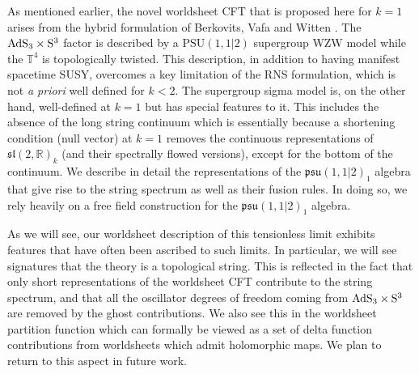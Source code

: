 \documentclass[12pt,a4paper]{article}
\begin{document}
As mentioned earlier, the novel worldsheet CFT that is proposed here for $k=1$ arises from the hybrid formulation of Berkovits, Vafa and Witten \cite{Berkovits:1999im}. 
The ${\rm AdS}_3\times {\rm S}^3$ \linebreak factor is described by a 
$\mathrm{PSU}(1,1|2)$ supergroup WZW model while the  $\mathbb{T}^4$ is topologically twisted.  
This description, in addition to having manifest spacetime SUSY,  overcomes a key limitation of the RNS formulation, which is not {\it a priori} well defined for $k <2$. The supergroup sigma model is, on the other hand, well-defined at $k=1$ but has special features to it. This includes the absence of the long string continuum which is essentially because a shortening condition (null vector) at $k=1$ removes the continuous representations of $\mathfrak{sl}(2,\mathds{R})_k$ (and their spectrally flowed versions), %
except for the bottom of the continuum. We describe in detail the representations of the $\mathfrak{psu}(1,1|2)_1$ algebra that give rise to the string spectrum as well as their fusion rules. In doing so, we rely heavily on a free field construction for the  $\mathfrak{psu}(1,1|2)_1$ algebra. 

As we will see, our worldsheet description of this tensionless limit exhibits features that 
have often been ascribed to such limits. In particular, we will see signatures that the theory is a topological string. This is reflected in the fact that only short representations of the worldsheet 
CFT contribute to the string spectrum, and that all the oscillator degrees of freedom coming from ${\rm AdS}_3 \times {\rm S}^3$ are removed by the ghost contributions. We also see this in the worldsheet partition function which can formally be viewed as a set of delta function contributions from worldsheets which admit holomorphic maps. We plan to return to this aspect in future work.    
 \medskip
 
\end{document}
